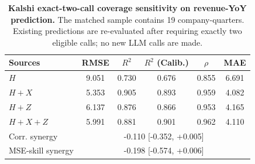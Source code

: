 \begin{table}[t]
\centering
\caption{\textbf{Kalshi exact-two-call coverage sensitivity on revenue-YoY prediction.}
The matched sample contains 19 company-quarters. Existing predictions
are re-evaluated after requiring exactly two eligible calls; no new LLM calls are made.}
\label{tab:kalshi_exact_two_call}
\begin{tabular}{lccccc}
\toprule
Sources & RMSE & $R^2$ & $R^2$ (Calib.) & $\rho$ & MAE \\
\midrule
$H$ & 9.051 & 0.730 & 0.676 & 0.855 & 6.691 \\
$H+X$ & 5.353 & 0.905 & 0.893 & 0.959 & 4.082 \\
$H+Z$ & 6.137 & 0.876 & 0.866 & 0.953 & 4.165 \\
$H+X+Z$ & 5.991 & 0.881 & 0.901 & 0.962 & 4.110 \\
\midrule
Corr. synergy & \multicolumn{5}{c}{-0.110 [-0.352, +0.005]} \\
MSE-skill synergy & \multicolumn{5}{c}{-0.198 [-0.574, +0.006]} \\
\bottomrule
\end{tabular}
\end{table}
